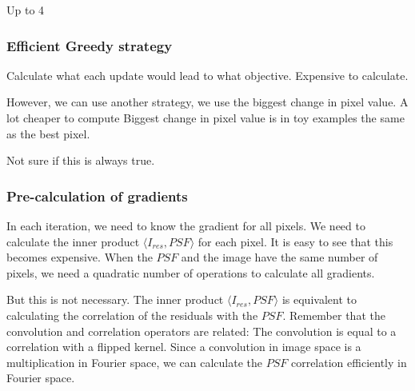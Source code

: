 Up to 4 


\subsubsection{Efficient Greedy strategy}

Calculate what each update would lead to what objective.
Expensive to calculate.

However, we can use another strategy, we use the biggest change in pixel value.
A lot cheaper to compute
Biggest change in pixel value is in toy examples the same as the best pixel. 

Not sure if this is always true.


\subsubsection{Pre-calculation of gradients}
In each iteration, we need to know the gradient for all pixels. We need to calculate the inner product $\langle I_{res},PSF\rangle$ for each pixel. It is easy to see that this becomes expensive. When the $PSF$ and the image have the same number of pixels, we need a quadratic number of operations to calculate all gradients.

But this is not necessary. The inner product $\langle I_{res},PSF\rangle$ is equivalent to calculating the correlation of the residuals with the $PSF$. Remember that the convolution and correlation operators are related: The convolution is equal to a correlation with a flipped kernel. Since a convolution in image space is a multiplication in Fourier space, we can calculate the $PSF$ correlation efficiently in Fourier space.


